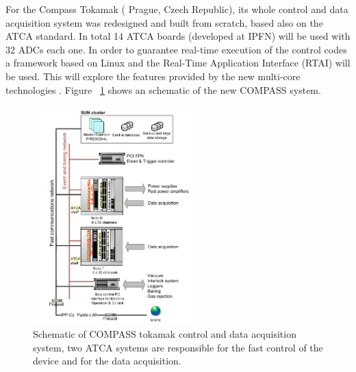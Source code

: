 For the Compass Tokamak ( Prague, Czech Republic), its whole control and data acquisition system was redesigned and built from scratch, based also on the ATCA standard. In total 14 ATCA  boards (developed at IPFN) will be used with 32 ADCs each one. In order to guarantee real-time execution of the control codes a framework based on Linux and the Real-Time Application Interface (RTAI) will be used. This will explore the features provided by the new multi-core technologies \cite{ATCA2010}. Figure  ~\ref{Compass} shows an schematic of the new COMPASS system.
\smallskip


\begin{figure}[htbp]
	\centering
	\includegraphics[width=0.55\textwidth]{Chp2/COMPASS_ATCA.png}
	\caption{\label{Compass} Schematic of COMPASS tokamak control and data acquisition
		system,  two ATCA systems are responsible for the fast control of the device and for the data acquisition. \cite{ATCA2010}}
	
\end{figure}

